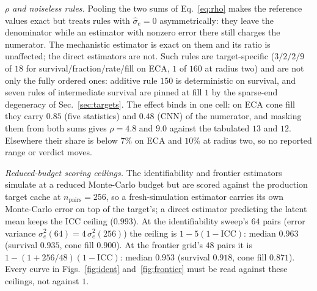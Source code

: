 \documentclass[aip,cha,amsmath,amssymb,reprint,floatfix]{revtex4-2}
\begin{document}
\emph{$\rho$ and noiseless rules.} Pooling the two sums of
Eq.~\eqref{eq:rho} makes the reference values exact but treats rules with
$\hat\sigma_e=0$ asymmetrically: they leave the denominator while an
estimator with nonzero error there still charges the numerator. The
mechanistic estimator is exact on them and its ratio is unaffected; the
direct estimators are not. Such rules are target-specific ($3/2/2/9$ of $18$
for survival/fraction/rate/fill on ECA, $1$ of $160$ at radius two) and are
not only the fully ordered ones: additive rule $150$ is deterministic on
survival, and seven rules of intermediate survival are pinned at fill $1$ by
the sparse-end degeneracy of Sec.~\ref{sec:targets}. The effect binds in one
cell: on ECA cone fill they carry $0.85$ (five statistics) and $0.48$ (CNN)
of the numerator, and masking them from both sums gives $\rho=4.8$ and
$9.0$ against the tabulated $13$ and $12$. Elsewhere their share is below
$7\%$ on ECA and $10\%$ at radius two, so no reported range or verdict
moves.

\emph{Reduced-budget scoring ceilings.} The identifiability and frontier
estimators simulate at a reduced Monte-Carlo budget but are scored against
the production target cache at $n_{\mathrm{pairs}}=256$, so a
fresh-simulation estimator carries its own Monte-Carlo error on top of the
target's; a direct estimator predicting the latent mean keeps the ICC
ceiling ($0.993$). At the identifiability sweep's $64$ pairs (error
variance $\sigma_e^2(64)=4\,\sigma_e^2(256)$) the ceiling is
$1-5(1-\mathrm{ICC})$: median $0.963$ (survival $0.935$, cone fill $0.900$).
At the frontier grid's $48$ pairs it is $1-(1+256/48)(1-\mathrm{ICC})$:
median $0.953$ (survival $0.918$, cone fill $0.871$). Every curve in
Figs.~\ref{fig:ident} and~\ref{fig:frontier} must be read against these
ceilings, not against $1$.
\end{document}
